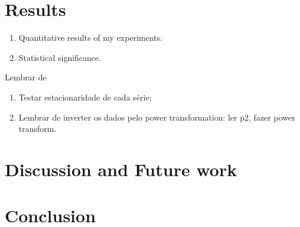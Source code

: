 \section{Results}
\label{sec:results}

\begin{enumerate}
    \item Quantitative results of my experiments. 
    \item Statistical significance.
\end{enumerate}

Lembrar de 

\begin{enumerate}
    \item Testar estacionaridade de cada série; 
    \item Lembrar de inverter os dados pelo power transformation: ler p2,
    fazer power transform. 
\end{enumerate}



\section{Discussion and Future work}
\label{sec:discussion}


\section{Conclusion}
\label{sec:conclusion}
